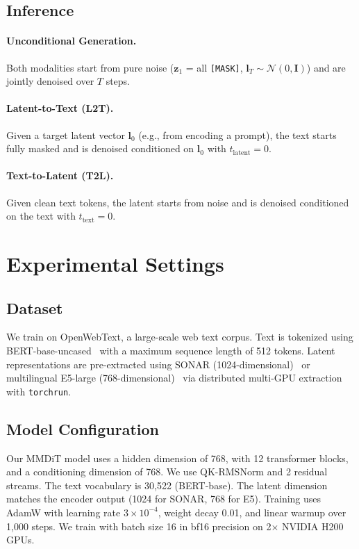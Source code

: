 \documentclass{article}
\begin{document}
\subsection{Inference}

\paragraph{Unconditional Generation.} Both modalities start from pure noise ($\mathbf{z}_1$ = all \texttt{[MASK]}, $\mathbf{l}_T \sim \mathcal{N}(0, \mathbf{I})$) and are jointly denoised over $T$ steps.

\paragraph{Latent-to-Text (L2T).} Given a target latent vector $\mathbf{l}_0$ (e.g., from encoding a prompt), the text starts fully masked and is denoised conditioned on $\mathbf{l}_0$ with $t_{\text{latent}} = 0$.

\paragraph{Text-to-Latent (T2L).} Given clean text tokens, the latent starts from noise and is denoised conditioned on the text with $t_{\text{text}} = 0$.

\section{Experimental Settings}\label{sec:settings}

\subsection{Dataset}

We train on OpenWebText, a large-scale web text corpus. Text is tokenized using BERT-base-uncased~\citep{devlin2019bert} with a maximum sequence length of 512 tokens. Latent representations are pre-extracted using SONAR (1024-dimensional)~\citep{duquenne2023sonar} or multilingual E5-large (768-dimensional)~\citep{wang2024e5} via distributed multi-GPU extraction with \texttt{torchrun}.

\subsection{Model Configuration}

Our MMDiT model uses a hidden dimension of 768, with 12 transformer blocks, and a conditioning dimension of 768. We use QK-RMSNorm and 2 residual streams. The text vocabulary is 30,522 (BERT-base). The latent dimension matches the encoder output (1024 for SONAR, 768 for E5). Training uses AdamW with learning rate $3 \times 10^{-4}$, weight decay 0.01, and linear warmup over 1,000 steps. We train with batch size 16 in bf16 precision on 2$\times$ NVIDIA H200 GPUs.
\end{document}
